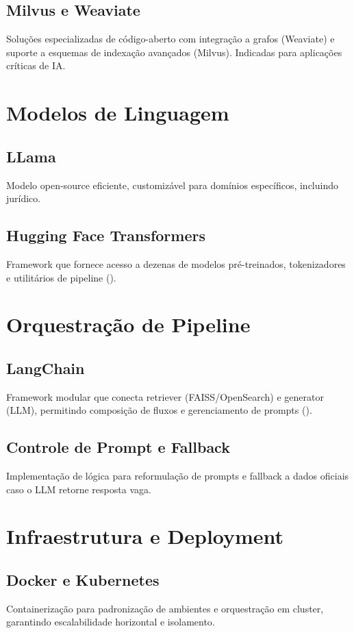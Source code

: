 \subsection{Milvus e Weaviate}
Soluções especializadas de código-aberto com integração a grafos (Weaviate) e suporte a esquemas de indexação avançados (Milvus). Indicadas para aplicações críticas de IA.

\section{Modelos de Linguagem}
\subsection{LLama}
Modelo open-source eficiente, customizável para domínios específicos, incluindo jurídico.

\subsection{Hugging Face Transformers}
Framework que fornece acesso a dezenas de modelos pré-treinados, tokenizadores e utilitários de pipeline (\cite{huggingface2024}).

\section{Orquestração de Pipeline}
\subsection{LangChain}
Framework modular que conecta retriever (FAISS/OpenSearch) e generator (LLM), permitindo composição de fluxos e gerenciamento de prompts (\cite{langchain2024}).

\subsection{Controle de Prompt e Fallback}
Implementação de lógica para reformulação de prompts e fallback a dados oficiais caso o LLM retorne resposta vaga.

\section{Infraestrutura e Deployment}
\subsection{Docker e Kubernetes}
Containerização para padronização de ambientes e orquestração em cluster, garantindo escalabilidade horizontal e isolamento.

